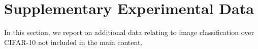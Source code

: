 \section{Supplementary Experimental Data}
\label{app:experiments}
In this section, we report on additional data relating to image classification over CIFAR-10 \cite{krizhevsky2009learning} not included in the main content. 

